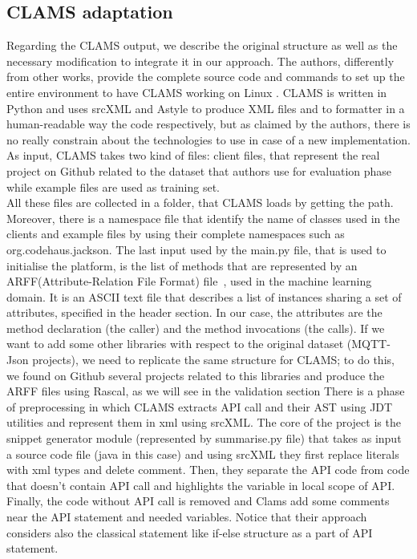 \subsection{CLAMS adaptation}
Regarding the CLAMS output, we describe the original structure as well as the necessary modification to integrate it in our approach. The authors, differently from other works, provide the complete source code and commands to set up the entire environment to have CLAMS working on Linux . CLAMS is written in Python and uses srcXML and Astyle to produce XML files and to formatter in a human-readable way the code respectively, but as claimed by the authors, there is no really constrain about the technologies to use in case of a new implementation. As input, CLAMS takes two kind of files: client files, that represent the real project on Github related to the dataset that authors use for evaluation phase while example files are used as training set.\\ 
All these files are collected in a folder, that CLAMS loads by getting the path. Moreover, there is a namespace file that identify the name of classes used in the clients and example files by using their complete namespaces such as org.codehaus.jackson. The last input used by the main.py file, that is used to initialise the platform, is the list of methods that are represented by an ARFF(Attribute-Relation File Format) file~\cite{https://www.cs.waikato.ac.nz_last_nodate}, used in the machine learning domain. It is an ASCII text file that describes a list of instances sharing a set of attributes, specified in the header section. In our case, the attributes are the method declaration (the caller) and the method invocations (the calls). 
If we want to add some other libraries with respect to the original dataset (MQTT-Json projects), we need to replicate the same structure for CLAMS; to do this, we found on Github several projects related to this libraries and produce the ARFF files using Rascal, as we will see in the validation section
\newline
There is a phase of preprocessing in which CLAMS extracts API call and their AST using JDT utilities and represent them in xml using srcXML. The core of the project is the snippet generator module (represented by summarise.py file) that takes as input a source code file (java in this case) and using srcXML they first replace literals with xml types and delete comment. Then, they separate the API code from code that doesn't contain API call and highlights the variable in local scope of API. Finally, the code without API call is removed and Clams add some comments near the API statement and needed variables. Notice that their approach considers also the classical statement like if-else structure as a part of API statement. \\
